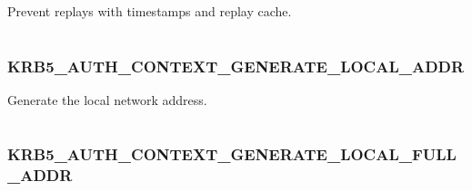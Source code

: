 \documentclass[letterpaper,10pt,english]{sphinxmanual}
\begin{document}
Prevent replays with timestamps and replay cache.

\begin{tabulary}{\linewidth}{|L|L|}
\hline

 & 
\\
\hline\end{tabulary}



\subsubsection{KRB5\_AUTH\_CONTEXT\_GENERATE\_LOCAL\_ADDR}
\label{appdev/refs/macros/KRB5_AUTH_CONTEXT_GENERATE_LOCAL_ADDR::doc}\label{appdev/refs/macros/KRB5_AUTH_CONTEXT_GENERATE_LOCAL_ADDR:krb5-auth-context-generate-local-addr}\label{appdev/refs/macros/KRB5_AUTH_CONTEXT_GENERATE_LOCAL_ADDR:krb5-auth-context-generate-local-addr-data}

\begin{fulllineitems}
\label{appdev/refs/macros/KRB5_AUTH_CONTEXT_GENERATE_LOCAL_ADDR:KRB5_AUTH_CONTEXT_GENERATE_LOCAL_ADDR}
\end{fulllineitems}


Generate the local network address.

\begin{tabulary}{\linewidth}{|L|L|}
\hline

 & 
\\
\hline\end{tabulary}



\subsubsection{KRB5\_AUTH\_CONTEXT\_GENERATE\_LOCAL\_FULL\_ADDR}
\label{appdev/refs/macros/KRB5_AUTH_CONTEXT_GENERATE_LOCAL_FULL_ADDR:krb5-auth-context-generate-local-full-addr}\label{appdev/refs/macros/KRB5_AUTH_CONTEXT_GENERATE_LOCAL_FULL_ADDR:krb5-auth-context-generate-local-full-addr-data}\label{appdev/refs/macros/KRB5_AUTH_CONTEXT_GENERATE_LOCAL_FULL_ADDR::doc}

\begin{fulllineitems}
\label{appdev/refs/macros/KRB5_AUTH_CONTEXT_GENERATE_LOCAL_FULL_ADDR:KRB5_AUTH_CONTEXT_GENERATE_LOCAL_FULL_ADDR}
\end{fulllineitems}
\end{document}
